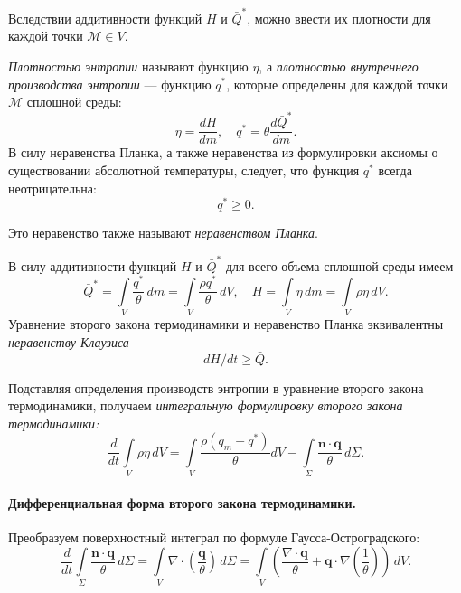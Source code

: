 Вследствии аддитивности функций $H$ и $\bar{Q}^{\ast}$, можно ввести их плотности для каждой точки $\mathcal{M} \in V$.

\begin{definition*}
	\textit{Плотностью энтропии} называют функцию $\eta$, а \textit{плотностью внутреннего производства энтропии} --- функцию $q^{\ast}$, которые определены для каждой точки $\mathcal{M}$ сплошной среды:
	\begin{equation*}
		\eta =\frac{dH}{dm}, \quad q^{\ast} = \theta \frac{d\bar{Q}^{\ast}}{dm}.
	\end{equation*}
	В силу неравенства Планка, а также неравенства из формулировки аксиомы о существовании абсолютной температуры, следует, что функция $q^{\ast}$ всегда неотрицательна:
	\begin{equation*}
		q^{\ast} \geqslant 0.
	\end{equation*}
	
	Это неравенство также называют \textit{неравенством Планка}. 
	
	В силу аддитивности функций $H$ и $\bar{Q}^{\ast}$ для всего объема сплошной среды имеем 
	\begin{equation*}
		\bar{Q}^{\ast} = \int\limits_{V} \frac{q^{\ast}}{\theta} \, dm = \int\limits_{V} \frac{\rho q^{\ast}}{\theta} \, dV, \quad H = \int\limits_{V} \eta \, dm = \int\limits_{V} \rho \eta \, dV.
	\end{equation*} 
	Уравнение второго закона термодинамики и неравенство Планка эквивалентны \textit{неравенству Клаузиса}
	\begin{equation*}
		dH / dt \geqslant \bar{Q}.
	\end{equation*}
	
	Подставляя определения производств энтропии в уравнение второго закона термодинамики, получаем \textit{интегральную формулировку второго закона термодинамики:}
	\begin{equation*}
		\frac{d}{dt} \int\limits_{V} \rho \eta \, dV = \int\limits_{V} \frac{\rho(q_m + q^{\ast})}{\theta} dV - \int\limits_{\Sigma} \frac{\mathbf{n} \cdot \mathbf{q}}{\theta} \, d\Sigma. 
	\end{equation*}
\end{definition*}

\paragraph{Дифференциальная форма второго закона термодинамики.} Преобразуем поверхностный интеграл по формуле Гаусса-Остроградского:
\begin{equation*}
	\frac{d}{dt} \int\limits_{\Sigma} \frac{\mathbf{n} \cdot \mathbf{q}}{\theta} \, d\Sigma = \int\limits_{V} \nabla \cdot \left(\frac{\mathbf{q}}{\theta}\right) \, d\Sigma = \int\limits_{V} \left(\frac{\nabla \cdot \mathbf{q}}{\theta} + \mathbf{q} \cdot \nabla \left(\frac{1}{\theta}\right)\right) \, dV.
\end{equation*}

